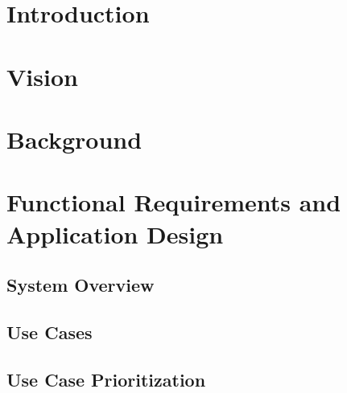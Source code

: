 \documentclass[a4paper,12pt]{article}
\begin{document}
	\newpage
	
	\section{Introduction}	
	
	
	\section{Vision}
		
	
	
	\section{Background}	
	
	
	
	\section{Functional Requirements and Application Design}
	
		\subsection{System Overview}
		
		\subsection{Use Cases}
		
		
		\subsection{Use Case Prioritization}
		
		
\end{document}
